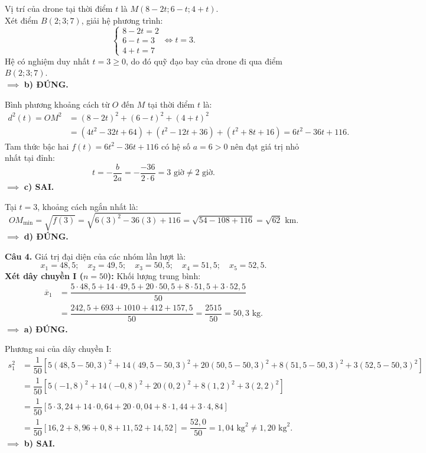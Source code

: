 \documentclass[12pt,a4paper]{article}
\begin{document}
Vị trí của drone tại thời điểm $t$ là $M(8 - 2t; 6 - t; 4 + t)$.\\
Xét điểm $B(2; 3; 7)$, giải hệ phương trình:
\[
\begin{cases}
8 - 2t = 2 \\
6 - t = 3 \\
4 + t = 7
\end{cases}
\iff t = 3.
\]
Hệ có nghiệm duy nhất $t = 3 \ge 0$, do đó quỹ đạo bay của drone đi qua điểm $B(2; 3; 7)$.\\
$\implies$ \textbf{b) ĐÚNG.}

Bình phương khoảng cách từ $O$ đến $M$ tại thời điểm $t$ là:
\begin{align*}
d^2(t) = OM^2 &= (8 - 2t)^2 + (6 - t)^2 + (4 + t)^2 \\
&= (4t^2 - 32t + 64) + (t^2 - 12t + 36) + (t^2 + 8t + 16) = 6t^2 - 36t + 116.
\end{align*}
Tam thức bậc hai $f(t) = 6t^2 - 36t + 116$ có hệ số $a = 6 > 0$ nên đạt giá trị nhỏ nhất tại đỉnh:
\[
t = -\dfrac{b}{2a} = -\dfrac{-36}{2 \cdot 6} = 3\text{ giờ} \ne 2\text{ giờ}.
\]
$\implies$ \textbf{c) SAI.}

Tại $t = 3$, khoảng cách ngắn nhất là:
\[
OM_{\min} = \sqrt{f(3)} = \sqrt{6(3)^2 - 36(3) + 116} = \sqrt{54 - 108 + 116} = \sqrt{62}\text{ km}.
\]
$\implies$ \textbf{d) ĐÚNG.}

\vspace{0.3cm}
\noindent\textbf{Câu 4.}
Giá trị đại diện của các nhóm lần lượt là:
\[
x_1 = 48{,}5;\quad x_2 = 49{,}5;\quad x_3 = 50{,}5;\quad x_4 = 51{,}5;\quad x_5 = 52{,}5.
\]
\textbf{Xét dây chuyền I ($n = 50$):}
Khối lượng trung bình:
\begin{align*}
\overline{x}_1 &= \dfrac{5 \cdot 48{,}5 + 14 \cdot 49{,}5 + 20 \cdot 50{,}5 + 8 \cdot 51{,}5 + 3 \cdot 52{,}5}{50} \\
&= \dfrac{242{,}5 + 693 + 1010 + 412 + 157{,}5}{50} = \dfrac{2515}{50} = 50{,}3\text{ kg}.
\end{align*}
$\implies$ \textbf{a) ĐÚNG.}

Phương sai của dây chuyền I:
\begin{align*}
s_1^2 &= \dfrac{1}{50} \left[ 5(48{,}5 - 50{,}3)^2 + 14(49{,}5 - 50{,}3)^2 + 20(50{,}5 - 50{,}3)^2 + 8(51{,}5 - 50{,}3)^2 + 3(52{,}5 - 50{,}3)^2 \right] \\
&= \dfrac{1}{50} \left[ 5(-1{,}8)^2 + 14(-0{,}8)^2 + 20(0{,}2)^2 + 8(1{,}2)^2 + 3(2{,}2)^2 \right] \\
&= \dfrac{1}{50} \left[ 5 \cdot 3{,}24 + 14 \cdot 0{,}64 + 20 \cdot 0{,}04 + 8 \cdot 1{,}44 + 3 \cdot 4{,}84 \right] \\
&= \dfrac{1}{50} \left[ 16{,}2 + 8{,}96 + 0{,}8 + 11{,}52 + 14{,}52 \right] = \dfrac{52{,}0}{50} = 1{,}04\text{ kg}^2 \ne 1{,}20\text{ kg}^2.
\end{align*}
$\implies$ \textbf{b) SAI.}
\end{document}
